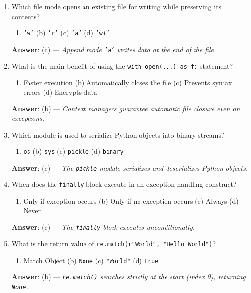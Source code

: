 \begin{enumerate}[leftmargin=1.5em]
    \item Which file mode opens an existing file for writing while preserving its contents?
    \begin{enumerate}[label=(\alph*)]
        \item \texttt{'w'} \quad (b) \texttt{'r'} \quad (c) \texttt{'a'} \quad (d) \texttt{'w+'}
    \end{enumerate}
    \textbf{Answer}: (c) --- \textit{Append mode \texttt{'a'} writes data at the end of the file.}

    \item What is the main benefit of using the \texttt{with open(...) as f:} statement?
    \begin{enumerate}[label=(\alph*)]
        \item Faster execution \quad (b) Automatically closes the file \quad (c) Prevents syntax errors \quad (d) Encrypts data
    \end{enumerate}
    \textbf{Answer}: (b) --- \textit{Context managers guarantee automatic file closure even on exceptions.}

    \item Which module is used to serialize Python objects into binary streams?
    \begin{enumerate}[label=(\alph*)]
        \item \texttt{os} \quad (b) \texttt{sys} \quad (c) \texttt{pickle} \quad (d) \texttt{binary}
    \end{enumerate}
    \textbf{Answer}: (c) --- \textit{The \texttt{pickle} module serializes and deserializes Python objects.}

    \item When does the \texttt{finally} block execute in an exception handling construct?
    \begin{enumerate}[label=(\alph*)]
        \item Only if exception occurs \quad (b) Only if no exception occurs \quad (c) Always \quad (d) Never
    \end{enumerate}
    \textbf{Answer}: (c) --- \textit{The \texttt{finally} block executes unconditionally.}

    \item What is the return value of \texttt{re.match(r"World", "Hello World")}?
    \begin{enumerate}[label=(\alph*)]
        \item Match Object \quad (b) \texttt{None} \quad (c) \texttt{"World"} \quad (d) \texttt{True}
    \end{enumerate}
    \textbf{Answer}: (b) --- \textit{\texttt{re.match()} searches strictly at the start (index 0), returning \texttt{None}.}


\end{enumerate}
